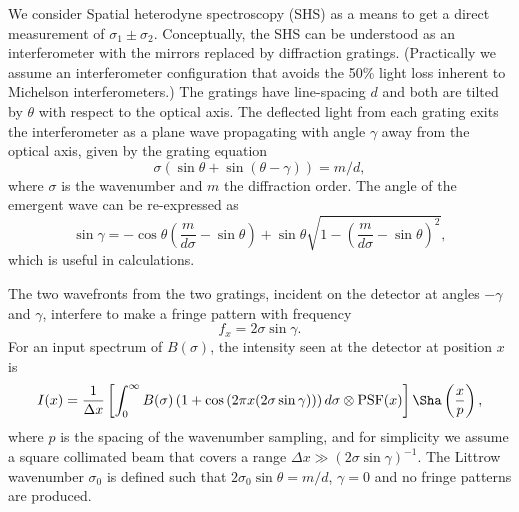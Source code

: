 \documentclass[preprint]{aastex}
\begin{document}
We consider Spatial heterodyne spectroscopy (SHS) \citep{1990SPIE.1235..622H}
as a means to get a direct measurement of  $\sigma_1\pm\sigma_2$.
Conceptually, the SHS can be understood as an interferometer with the  mirrors replaced by diffraction gratings.
(Practically we assume an interferometer configuration that  avoids the 50\% light loss inherent to  Michelson interferometers.)
The gratings have line-spacing $d$ and both are tilted
by $\theta$ with respect to the optical axis.  The deflected light from each grating exits the interferometer as a plane wave
propagating with angle $\gamma$ away from the optical axis,  given by the grating equation
\begin{equation}
\sigma\left(\sin{\theta}+\sin{\left(\theta-\gamma\right)}\right)=m/d,
\end{equation}
where $\sigma$ is the wavenumber and $m$ the diffraction order.
The angle of the emergent wave can be re-expressed as
\begin{equation}
\sin{\gamma}=-\cos{\theta} \left(\frac{m}{d\sigma} - \sin{\theta} \right)+ \sin{\theta}\sqrt{1-\left(\frac{m}{d\sigma} -\sin{\theta} \right)^2},
\end{equation}
which is useful in calculations.

The two wavefronts from the two gratings, incident on the detector at angles $-\gamma$ and $\gamma$, interfere to make a fringe
pattern with  frequency
\begin{equation}
f_x=2\sigma\sin{\gamma}.
\end{equation}
For an input spectrum of $B(\sigma)$, the intensity seen at the detector at position $x$ is
\begin{equation}
I(x)=\frac{1}{\Delta x}\left[\int_{0}^{\infty} B(\sigma)\left(1+\cos{\left(2 \pi x (2\sigma \sin{\gamma})\right)}\right)d\sigma \otimes \mbox{PSF}(x)\right]\Sha\left(\frac{x}{p}\right),
\end{equation}
where  $p$ is the spacing of the wavenumber sampling, and for simplicity we assume a square collimated beam that covers
a range  $\Delta x \gg \left(2\sigma \sin{\gamma}\right)^{-1}$.
The Littrow wavenumber $\sigma_0$ is defined such that $2\sigma_0\sin{\theta}=m/d$, $\gamma=0$ and no fringe patterns are produced.

\end{document}
